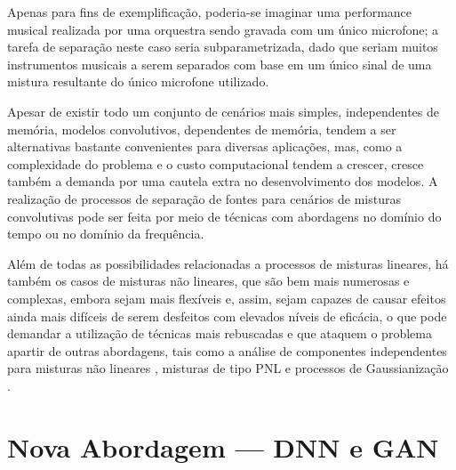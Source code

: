 Apenas para fins de exemplificação, poderia-se imaginar uma performance musical realizada por uma orquestra sendo gravada com um único microfone; a tarefa de separação neste caso seria subparametrizada, dado que seriam muitos instrumentos musicais a serem separados com base em um único sinal de uma mistura resultante do único microfone utilizado.





Apesar de existir todo um conjunto de cenários mais simples, independentes de memória, modelos convolutivos, dependentes de memória, tendem a ser alternativas bastante convenientes para diversas aplicações, mas, como a complexidade do problema e o custo computacional tendem a crescer, cresce também a demanda por uma cautela extra no desenvolvimento dos modelos. A realização de processos de separação de fontes para cenários de misturas convolutivas pode ser feita por meio de técnicas com abordagens no domínio do tempo ou no domínio da frequência.





Além de todas as possibilidades relacionadas a processos de misturas lineares, há também os casos de misturas não lineares, que são bem mais numerosas e complexas, embora sejam mais flexíveis e, assim, sejam capazes de causar efeitos ainda mais difíceis de serem desfeitos com elevados níveis de eficácia, o que pode demandar a utilização de técnicas mais rebuscadas e que ataquem o problema apartir de outras abordagens, tais como a análise de componentes independentes para misturas não lineares \citep{hyvarinen1999nonlinear}, misturas de tipo PNL \citep{taleb1999source} e processos de Gaussianização \citep{sole2003improving, ziehe2003blind}.



\section{Nova Abordagem --- DNN e GAN}
\label{sec:intro_new_approach}

